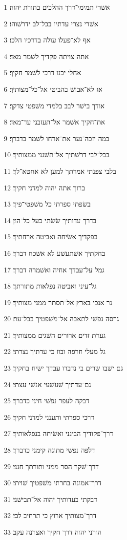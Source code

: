 \par 1 אשׁרי תמימי־דרך ההלכים בתורת יהוה׃
\par 2 אשׁרי נצרי עדתיו בכל־לב ידרשׁוהו׃
\par 3 אף לא־פעלו עולה בדרכיו הלכו׃
\par 4 אתה צויתה פקדיך לשׁמר מאד׃
\par 5 אחלי יכנו דרכי לשׁמר חקיך׃
\par 6 אז לא־אבושׁ בהביטי אל־כל־מצותיך׃
\par 7 אודך בישׁר לבב בלמדי משׁפטי צדקך׃
\par 8 את־חקיך אשׁמר אל־תעזבני עד־מאד׃
\par 9 במה יזכה־נער את־ארחו לשׁמר כדברך׃
\par 10 בכל־לבי דרשׁתיך אל־תשׁגני ממצותיך׃
\par 11 בלבי צפנתי אמרתך למען לא אחטא־לך׃
\par 12 ברוך אתה יהוה למדני חקיך׃
\par 13 בשׂפתי ספרתי כל משׁפטי־פיך׃
\par 14 בדרך עדותיך שׂשׂתי כעל כל־הון׃
\par 15 בפקדיך אשׂיחה ואביטה ארחתיך׃
\par 16 בחקתיך אשׁתעשׁע לא אשׁכח דברך׃
\par 17 גמל על־עבדך אחיה ואשׁמרה דברך׃
\par 18 גל־עיני ואביטה נפלאות מתורתך׃
\par 19 גר אנכי בארץ אל־תסתר ממני מצותיך׃
\par 20 גרסה נפשׁי לתאבה אל־משׁפטיך בכל־עת׃
\par 21 גערת זדים ארורים השׁגים ממצותיך׃
\par 22 גל מעלי חרפה ובוז כי עדתיך נצרתי׃
\par 23 גם ישׁבו שׂרים בי נדברו עבדך ישׂיח בחקיך׃
\par 24 גם־עדתיך שׁעשׁעי אנשׁי עצתי׃
\par 25 דבקה לעפר נפשׁי חיני כדברך׃
\par 26 דרכי ספרתי ותענני למדני חקיך׃
\par 27 דרך־פקודיך הבינני ואשׂיחה בנפלאותיך׃
\par 28 דלפה נפשׁי מתוגה קימני כדברך׃
\par 29 דרך־שׁקר הסר ממני ותורתך חנני׃
\par 30 דרך־אמונה בחרתי משׁפטיך שׁויתי׃
\par 31 דבקתי בעדותיך יהוה אל־תבישׁני׃
\par 32 דרך־מצותיך ארוץ כי תרחיב לבי׃
\par 33 הורני יהוה דרך חקיך ואצרנה עקב׃
